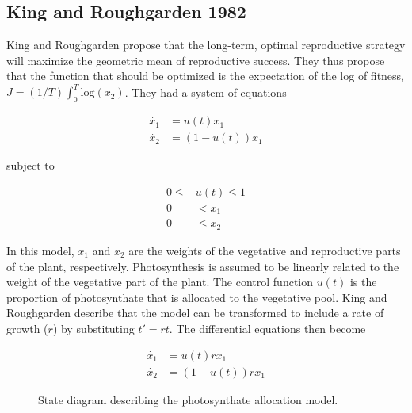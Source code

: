 
\subsection*{King and Roughgarden 1982}

\noindent King and Roughgarden propose that the long-term, optimal reproductive strategy will maximize the geometric mean of reproductive success. They thus propose that the function that should be optimized is the expectation of the log of fitness, $ J = (1/T) \int_{0}^{T} \mathrm{log}(x_2)$. They had a system of equations 

\begin{align}
\dot{x_1} & = u(t) x_1 \nonumber \\
\dot{x_2} & = (1-u(t)) x_1 
\end{align}

\noindent subject to

\begin{align}
0 \leq & u(t) \leq 1 \nonumber \\
0 & < x_1 \nonumber \\
0 & \leq x_2
\end{align}

\noindent In this model, $x_1$ and $x_2$ are the weights of the vegetative and reproductive parts of the plant, respectively. Photosynthesis is assumed to be linearly related to the weight of the vegetative part of the plant. The control function $u(t)$ is the proportion of photosynthate that is allocated to the vegetative pool. King and Roughgarden describe that the model can be transformed to include a rate of growth ($r$) by substituting $t' = rt$. The differential equations then become

\begin{align}
\dot{x_1} & = u(t) r x_1 \nonumber \\
\dot{x_2} & = (1-u(t)) r x_1 
\end{align}


\begin{figure}[!h]
\centering
{}
  \caption{State diagram describing the photosynthate allocation model.}
  \label{fig:birds}
\end{figure}

